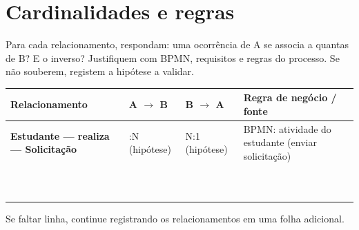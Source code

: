 \section{Cardinalidades e regras}

Para cada relacionamento, respondam: uma ocorrência de A se associa a quantas de B?
E o inverso? Justifiquem com BPMN, requisitos e regras do processo. Se não souberem,
registem a hipótese a validar.

\begin{table}[!ht]
\centering
\scriptsize
\setlength{\tabcolsep}{3pt}
\renewcommand{\arraystretch}{1.65}
\begin{tabularx}{\linewidth}{|>{\raggedright\arraybackslash}p{3.5cm}
                              |>{\centering\arraybackslash}X
                              |>{\centering\arraybackslash}X
                              |>{\raggedright\arraybackslash}X|}
\hline
\textbf{Relacionamento} &
\textbf{A $\rightarrow$ B} &
\textbf{B $\rightarrow$ A} &
\textbf{Regra de negócio / fonte} \\
\hline
\textbf{Estudante — realiza — Solicitação} &
1:N (hipótese) &
N:1 (hipótese) &
BPMN: atividade do estudante (enviar solicitação) \\
\hline
 & & & \\ \hline
 & & & \\ \hline
 & & & \\ \hline
 & & & \\ \hline
 & & & \\ \hline
 & & & \\ \hline
 & & & \\ \hline
 & & & \\ \hline
 & & & \\ \hline
 & & & \\ \hline
\end{tabularx}
\end{table}

\begin{warnbox}[Observação]
Se faltar linha, continue registrando os relacionamentos em uma folha adicional.
\end{warnbox}
